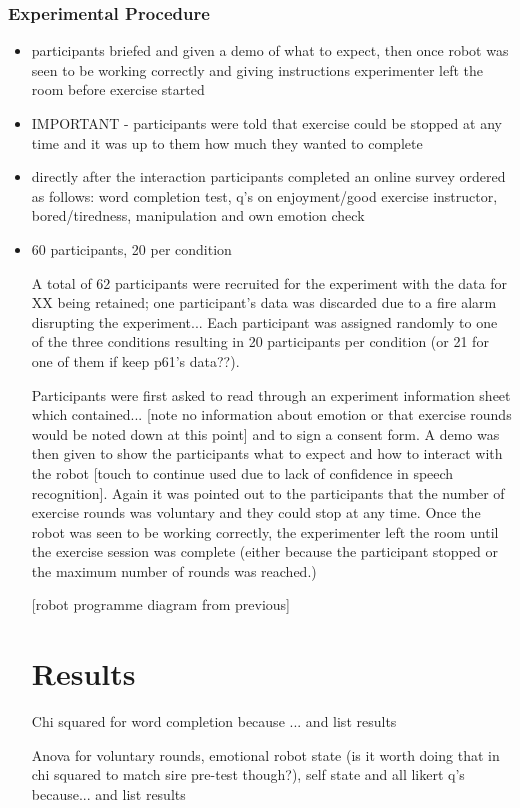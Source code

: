 \documentclass[11pt,a4paper]{report}
\begin{document}
\subsection{Experimental Procedure}
\begin{itemize}
	\item participants briefed and given a demo of what to expect, then once robot was seen to be working correctly and giving instructions experimenter left the room before exercise started
	\item IMPORTANT - participants were told that exercise could be stopped at any time and it was up to them how much they wanted to complete
	\item directly after the interaction participants completed an online survey ordered as follows: word completion test, q's on enjoyment/good exercise instructor, bored/tiredness, manipulation and own emotion check
	\item 60 participants, 20 per condition
	
A total of 62 participants were recruited for the experiment with the data for XX being retained; one participant's data was discarded due to a fire alarm disrupting the experiment... Each participant was assigned randomly to one of the three conditions resulting in 20 participants per condition (or 21 for one of them if keep p61's data??).  

Participants were first asked to read through an experiment information sheet which contained... [note no information about emotion or that exercise rounds would be noted down at this point] and to sign a consent form. A demo was then given to show the participants what to expect and how to interact with the robot [touch to continue used due to lack of confidence in speech recognition]. Again it was pointed out to the participants that the number of exercise rounds was voluntary and they could stop at any time. Once the robot was seen to be working correctly, the experimenter left the room until the exercise session was complete (either because the participant stopped or the maximum number of rounds was reached.)

[robot programme diagram from previous]

\chapter{Results}
Chi squared for word completion because ... and list results

Anova for voluntary rounds, emotional robot state (is it worth doing that in chi squared to match sire pre-test though?), self state and all likert q's because... and list results


\end{itemize}
\end{document}
